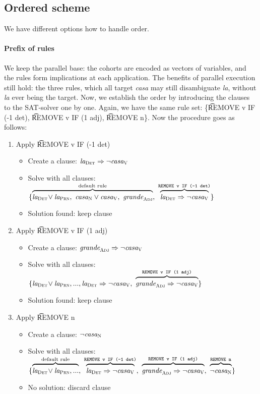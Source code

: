 \subsection{Ordered scheme}

We have different options how to handle order. 



\paragraph{Prefix of rules} We keep the parallel base: the cohorts are encoded as vectors of variables, and the rules form implications at each application.
The benefits of parallel execution still hold: the three rules, which all target \emph{casa} may still disambiguate \emph{la}, without \emph{la} ever being the target.
Now, we establish the order by introducing the clauses to the SAT-solver one by one. 
Again, we have the same rule set: \{\t{REMOVE v IF (-1 det)}, \t{REMOVE v IF (1 adj)}, \t{REMOVE n}\}. Now the procedure goes as follows:

\begin{enumerate}
\item Apply \t{REMOVE v IF (-1 det)}
 \begin{itemize}
    \item Create a clause: $\text{\em la}_{\text{\sc Det}} \Rightarrow \neg \text{\em casa}_{\text{\sc V}}$
    \item Solve with all clauses:
  $\{ \ob{\laDet \! \vee \laPrn, \ \casaN \vee \casaV, \  \grandeAdj}^{\text{default rule}}, \ 
      \ob{\laDet \Rightarrow \neg \casaV}^{\t{REMOVE v IF (-1 det)}} \}$
    \item Solution found: keep clause
 \end{itemize}
\item Apply \t{REMOVE v IF (1 adj)} 
 \begin{itemize}
    \item Create a clause: $\text{\em grande}_{\text{\sc Adj}} \Rightarrow \neg \text{\em casa}_{\text{\sc V}}$
    \item Solve with all clauses:
  $\{ \laDet \! \vee \laPrn, ..., \laDet \Rightarrow \neg \casaV, \ 
      \ob{\grandeAdj \Rightarrow \neg \casaV}^{\t{REMOVE v IF (1 adj)}}  \}$
    \item Solution found: keep clause
 \end{itemize}
\item Apply \t{REMOVE n}
 \begin{itemize}
    \item Create a clause: $\neg \text{\em casa}_{\text{\sc N}}$
    \item Solve with all clauses:
  $\{ \ob{\laDet \! \vee \laPrn, ...}^{\text{default rule}}, \ 
      \ob{\laDet \Rightarrow \neg \casaV}^{\t{REMOVE v IF (-1 det)}}, \ 
      \ob{\grandeAdj \Rightarrow \neg \casaV}^{\t{REMOVE v IF (1 adj)}}, \ 
      \ob{\neg \casaN}^{\t{REMOVE n}} \}$
    \item No solution: discard clause
 \end{itemize}
\end{enumerate}

